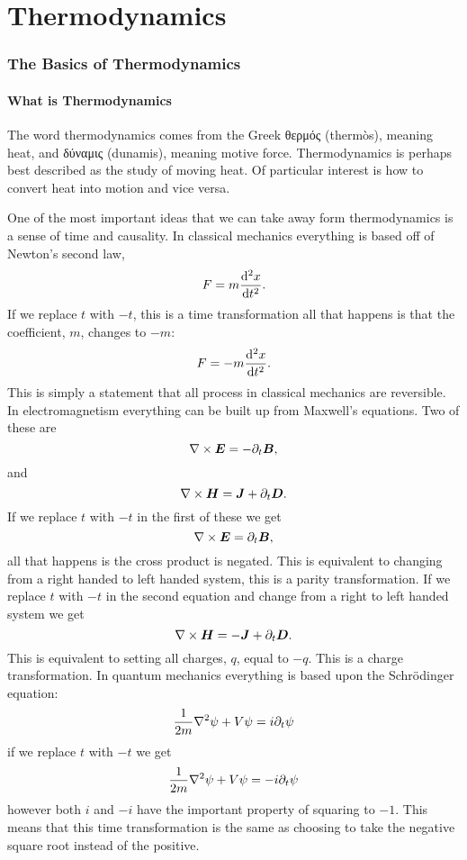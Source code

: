 \part{Thermodynamics}
    \section{The Basics of Thermodynamics}
    \subsection{What is Thermodynamics}
    The word thermodynamics comes from the Greek \textgreek{θερμός} (therm\`os), meaning heat, and \textgreek{δύναμις} (dunamis), meaning motive force.
    Thermodynamics is perhaps best described as the study of moving heat.
    Of particular interest is how to convert heat into motion and vice versa.
    
    One of the most important ideas that we can take away form thermodynamics is a sense of time and causality.
    In classical mechanics everything is based off of Newton's second law,
    \[F = m\dv[2]{x}{t}.\]
    If we replace \(t\) with \(-t\), this is a time transformation all that happens is that the coefficient, \(m\), changes to \(-m\):
    \[F = -m\dv[2]{x}{t}.\]
    This is simply a statement that all process in classical mechanics are reversible.
    In electromagnetism everything can be built up from Maxwell's equations.
    Two of these are
    \[\nabla\times\bm{E} = -\partial_t\bm{B},\]
    and
    \[\nabla\times\bm{H} = \bm{J} + \partial_t\bm{D}.\]
    If we replace \(t\) with \(-t\) in the first of these we get
    \[\nabla\times\bm{E} = \partial_t\bm{B},\]
    all that happens is the cross product is negated.
    This is equivalent to changing from a right handed to left handed system, this is a parity transformation.
    If we replace \(t\) with \(-t\) in the second equation and change from a right to left handed system we get
    \[\nabla\times\bm{H} = -\bm{J} + \partial_t\bm{D}.\]
    This is equivalent to setting all charges, \(q\), equal to \(-q\).
    This is a charge transformation.
    In quantum mechanics everything is based upon the Schr\"odinger equation:
    \[\frac{1}{2m}\nabla^2\psi + V\psi = i\partial_t\psi\]
    if we replace \(t\) with \(-t\) we get
    \[\frac{1}{2m}\nabla^2\psi + V\psi = -i\partial_t\psi\]
    however both \(i\) and \(-i\) have the important property of squaring to \(-1\).
    This means that this time transformation is the same as choosing to take the negative square root instead of the positive.
    

